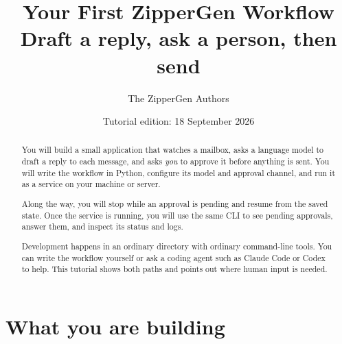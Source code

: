 \documentclass[11pt,a4paper]{article}
\title{\color{ZipperInk}\Huge\textbf{Your First ZipperGen Workflow}\\[5pt]
\Large Draft a reply, ask a person, then send}
\author{The ZipperGen Authors}
\date{Tutorial edition: 18 September 2026}
\begin{document}
\maketitle

\begin{abstract}
You will build a small application that watches a mailbox, asks a language
model to draft a reply to each message, and asks \emph{you} to approve it
before anything is sent. You will write the workflow in Python, configure its
model and approval channel, and run it as a service on your machine or server.

Along the way, you will stop while an approval is pending and resume from the
saved state. Once the service is running, you will use the same CLI to see
pending approvals, answer them, and inspect its status and logs.

Development happens in an ordinary directory with ordinary command-line tools.
You can write the workflow yourself or ask a coding agent such as Claude Code
or Codex to help. This tutorial shows both paths and points out where human
input is needed.
\end{abstract}

\section{What you are building}

\begin{center}
\end{center}
\end{document}
